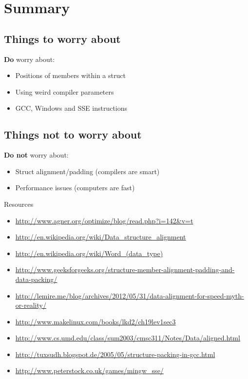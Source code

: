 \documentclass{beamer}
\begin{document}
\section{Summary}
\subsection{Things to worry about}
\begin{frame}{\insertsection}{\insertsubsection}
    \textbf{Do} worry about:
	\begin{itemize}
	    \item Positions of members within a struct
        \item Using weird compiler parameters
        \item GCC, Windows and SSE instructions
	\end{itemize}
\end{frame}

\subsection{Things not to worry about}
\begin{frame}{\insertsection}{\insertsubsection}
    \textbf{Do not} worry about:
	\begin{itemize}
	    \item Struct alignment/padding (compilers are smart)
	    \item Performance issues (computers are fast)
	\end{itemize}
\end{frame}

\begin{frame}{Resources}
	\begin{itemize}
        \tiny
        \item \url{http://www.agner.org/optimize/blog/read.php?i=142&v=t}
        \item \url{http://en.wikipedia.org/wiki/Data_structure_alignment}
        \item \url{http://en.wikipedia.org/wiki/Word_(data_type)}
        \item \url{http://www.geeksforgeeks.org/structure-member-alignment-padding-and-data-packing/}
        \item \url{http://lemire.me/blog/archives/2012/05/31/data-alignment-for-speed-myth-or-reality/}
        \item \url{http://www.makelinux.com/books/lkd2/ch19lev1sec3}
        \item \url{http://www.cs.umd.edu/class/sum2003/cmsc311/Notes/Data/aligned.html}
        \item \url{http://tuxsudh.blogspot.de/2005/05/structure-packing-in-gcc.html}
        \item \url{http://www.peterstock.co.uk/games/mingw_sse/}
	\end{itemize}
\end{frame}
\end{document}
